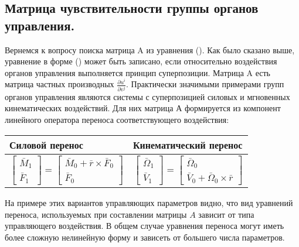 \documentclass[a4paper]{article}
\begin{document}
\subsection{Матрица чувствительности группы органов управления.}
Вернемся к вопросу поиска матрица A из уравнения (). Как было сказано выше, уравнение в форме () может быть записано, если относительно воздействия органов управления выполняется принцип суперпозиции. Матрица A есть матрица частных производных $\frac{\partial{u^i}}{\partial{v^j}}$. Практически значимыми примерами групп органов управления являются системы с суперпозицией силовых и мгновенных кинематических воздействий. Для них матрица А формируется из компонент линейного оператора переноса соответствующего воздействия:

\begin{table}[ht]
	\centering
	\begin{tabular}{| p{7cm} | p{7cm} |}
		\hline
		Силовой перенос & Кинематический перенос \\
		\hline
		\begin{equation} \label{eq:ftrans}
		\begin{bmatrix} \bar{M}_1 \\ \bar{F}_1 \end{bmatrix} 
			= \begin{bmatrix} \bar{M}_0 + \bar{r} \times \bar{F}_0 \\ \bar{F}_0 \end{bmatrix}
		\end{equation}
		&
		\begin{equation} \label{eq:ctrans}
		\begin{bmatrix} \bar{\Omega}_1 \\ \bar{V}_1 \end{bmatrix} 
			= \begin{bmatrix} \bar{\Omega}_0 \\ \bar{V}_0 + \bar{\Omega}_0 \times \bar{r} \end{bmatrix}
		\end{equation}\\
		
		\hline
	\end{tabular}
\end{table}

На примере этих вариантов управляющих параметров видно, что вид уравнений переноса, используемых при составлении матрицы $A$ зависит от типа управляющего воздействия. В общем случае уравнения переноса могут иметь более сложную нелинейную форму и зависеть от большего числа параметров. 
\end{document}
